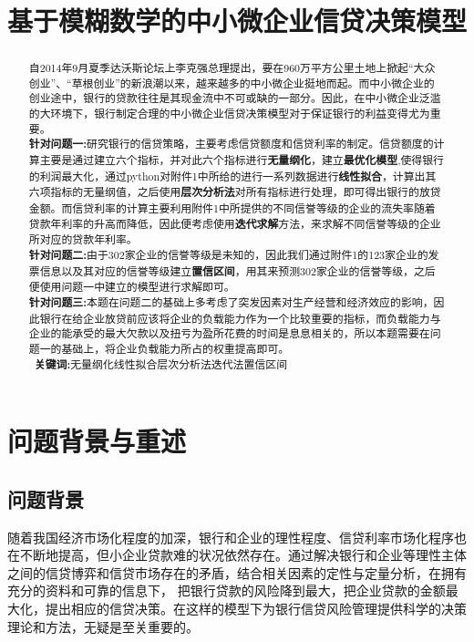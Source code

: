 \documentclass[dvipsnames,withoutpreface,bwprint]{cumcmthesis}
\title{基于模糊数学的中小微企业信贷决策模型}
\begin{document}
\maketitle
\begin{abstract}
自2014年9月夏季达沃斯论坛上李克强总理提出，要在960万平方公里土地上掀起“大众创业”、“草根创业”的新浪潮以来，越来越多的中小微企业挺地而起。而中小微企业的创业途中，银行的贷款往往是其现金流中不可或缺的一部分。因此，在中小微企业泛滥的大环境下，银行制定合理的中小微企业信贷决策模型对于保证银行的利益变得尤为重要。\\
\indent\textbf{针对问题一:}研究银行的信贷策略，主要考虑信贷额度和信贷利率的制定。信贷额度的计算主要是通过建立六个指标，并对此六个指标进行\textbf{无量纲化}，建立\textbf{最优化模型},使得银行的利润最大化，通过python对附件1中所给的进行一系列数据进行\textbf{线性拟合}，计算出其六项指标的无量纲值，之后使用\textbf{层次分析法}对所有指标进行处理，即可得出银行的放贷金额。而信贷利率的计算主要利用附件1中所提供的不同信誉等级的企业的流失率随着贷款年利率的升高而降低，因此便考虑使用\textbf{迭代求解}方法，来求解不同信誉等级的企业所对应的贷款年利率。\\
\indent\textbf{针对问题二:}由于302家企业的信誉等级是未知的，因此我们通过附件1的123家企业的发票信息以及其对应的信誉等级建立\textbf{置信区间}，用其来预测302家企业的信誉等级，之后便使用问题一中建立的模型进行求解即可。\\
\indent\textbf{针对问题三:}本题在问题二的基础上多考虑了突发因素对生产经营和经济效应的影响，因此银行在给企业放贷前应该将企业的负载能力作为一个比较重要的指标，而负载能力与企业的能承受的最大欠款以及扭亏为盈所花费的时间是息息相关的，所以本题需要在问题一的基础上，将企业负载能力所占的权重提高即可。\\
\
\indent\textbf{关键词:}\quad 无量纲化\quad 线性拟合\quad 层次分析法\quad 迭代法\quad 置信区间
\end{abstract}
\section{问题背景与重述}
\subsection{问题背景}
\par 随着我国经济市场化程度的加深，银行和企业的理性程度、信贷利率市场化程序也在不断地提高，但小企业贷款难的状况依然存在。通过解决银行和企业等理性主体之间的信贷博弈和信贷市场存在的矛盾，结合相关因素的定性与定量分析，在拥有充分的资料和可靠的信息下，
把银行贷款的风险降到最大，把企业贷款的金额最大化，提出相应的信贷决策。在这样的模型下为银行信贷风险管理提供科学的决策理论和方法，无疑是至关重要的。
\end{document}
